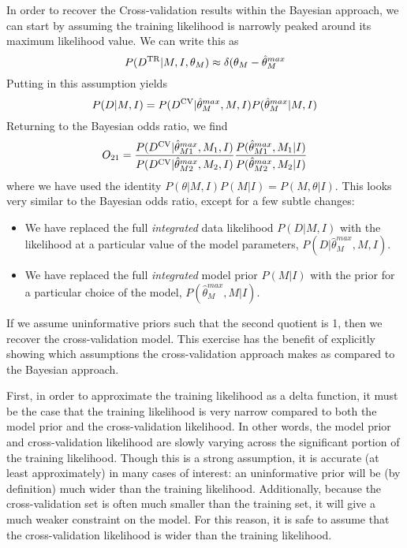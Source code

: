 \documentclass[12pt]{article}
\newcommand{\Dtr}{\ensuremath{D^{\rm TR}}}
\newcommand{\Dcv}{\ensuremath{D^{\rm CV}}}
\begin{document}
In order to recover the Cross-validation results within the Bayesian approach,
we can start by assuming the training likelihood is narrowly peaked around its
maximum likelihood value.  We can write this as
\begin{equation}
  P(\Dtr|M, I, \theta_M) \approx \delta(\theta_M - \hat{\theta}^{max}_M
\end{equation}
Putting in this assumption yields
\begin{equation}
  P(D|M,I) = P(\Dcv|\hat{\theta}^{max}_M,M,I)P(\hat{\theta}^{max}_M|M,I)
\end{equation}
Returning to the Bayesian odds ratio, we find
\begin{equation}
  O_{21} = \frac{P(\Dcv|\hat{\theta}^{max}_{M1},M_1,I)}
               {P(\Dcv|\hat{\theta}^{max}_{M2},M_2,I)}
          \frac{P(\hat{\theta}^{max}_{M1},M_1|I)}
               {P(\hat{\theta}^{max}_{M2},M_2|I)}
\end{equation}
where we have used the identity $P(\theta|M,I)P(M|I) = P(M,\theta|I)$.
This looks very similar to the Bayesian odds ratio, except for a few
subtle changes:
\begin{itemize}
  \item We have replaced the full {\it integrated} data likelihood
    $P(D|M,I)$ with the likelihood at a particular value of the model
    parameters, $P(D|\hat{\theta}^{max}_{M},M,I)$.
  \item We have replaced the full {\it integrated} model prior $P(M|I)$
    with the prior for a particular choice of the model,
    $P(\hat{\theta}^{max}_{M},M|I)$.
\end{itemize}
If we assume uninformative priors such that the second quotient is 1, then
we recover the cross-validation model.
This exercise has the benefit of explicitly showing which assumptions the
cross-validation approach makes as compared to the Bayesian approach.

First, in order to approximate the training likelihood as a delta function,
it must be the case that the training likelihood is very narrow compared to
both the model prior and the cross-validation likelihood.  In other words,
the model prior and cross-validation likelihood are slowly varying across
the significant portion of the training likelihood.  Though this is a strong
assumption, it is accurate (at least approximately) in many cases of interest:
an uninformative prior will be (by definition) much wider than the training
likelihood.  Additionally, because the cross-validation set is often much
smaller than the training set, it will give a much weaker constraint on the
model.  For this reason, it is safe to assume that the cross-validation
likelihood is wider than the training likelihood.
\end{document}
